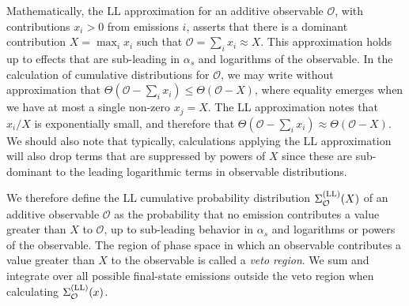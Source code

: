Mathematically, the LL approximation for an additive observable \(\mathcal{O}\), with contributions \(x_i > 0\) from emissions \(i\), asserts that there is a dominant contribution \(X = \max_i x_i\) such that \(\mathcal{O} = \sum_i x_i \approx X\).
%
This approximation holds up to effects that are sub-leading in \(\alpha_s\) and logarithms of the observable.
%
In the calculation of cumulative distributions for \(\mathcal{O}\), we may write without approximation that \(\Theta(\mathcal{O} - \sum_i x_i) \leq \Theta(\mathcal{O} - X)\), where equality emerges when we have at most a single non-zero \(x_j = X\).
%
The LL approximation notes that \(x_i / X \) is exponentially small, and therefore that \(\Theta(\mathcal{O} - \sum_i x_i) \approx \Theta(\mathcal{O} - X)\).
%
We should also note that typically, calculations applying the LL approximation will also drop terms that are suppressed by powers of \(X\) since these are sub-dominant to the leading logarithmic terms in observable distributions.

We therefore define the LL cumulative probability distribution \(\Sigma^{\rm(LL)}_{\mathcal{O}}(X)\) of an additive observable \(\mathcal{O}\) as the probability that no emission contributes a value greater than \(X\) to \(\mathcal{O}\), up to sub-leading behavior in \(\alpha_s\) and logarithms or powers of the observable.
%
The region of phase space in which an observable contributes a value greater than \(X\) to the observable is called a \textit{veto region}.
%
We sum and integrate over all possible final-state emissions outside the veto region when calculating \(\Sigma^{\rm(LL)}_{\mathcal{O}}(x)\).

